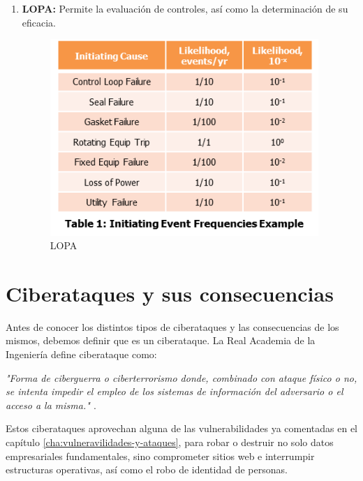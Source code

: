 \begin{enumerate}
\item {\bfseries LOPA:}
Permite la evaluación de controles, así como la determinación de su eficacia.
\begin{figure}[H]
  		   \centering
     		   \includegraphics[width=4in]{LOPA.png}
  		   \caption{LOPA \cite{lopa}}
  		   \label{img:lopa}
\end{figure}

\end{enumerate}

\chapter{Ciberataques y sus consecuencias}
\label{cha:ciberataques-y-consecuencias}

Antes de conocer los distintos tipos de ciberataques y las consecuencias de los mismos, debemos definir que es un ciberataque. La Real Academia 
de la Ingeniería define ciberataque como:

\emph{"Forma de ciberguerra o ciberterrorismo donde, combinado con ataque físico o no, se intenta impedir el empleo de los sistemas de información 
del adversario o el acceso a la misma." \cite{ciberataque-rai}}.

Estos ciberataques aprovechan alguna de las vulnerabilidades ya comentadas en el capítulo \ref{cha:vulneravilidades-y-ataques}, para robar o destruir
no solo datos empresariales fundamentales, sino comprometer sitios web e interrumpir estructuras operativas, así como el robo de identidad de personas.

